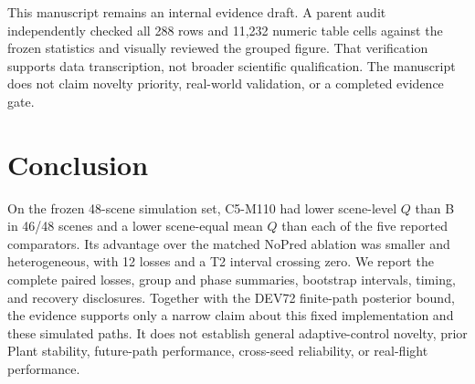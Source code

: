 \documentclass[11pt]{article}
\begin{document}
This manuscript remains an internal evidence draft. A parent audit independently checked all 288 rows and 11,232 numeric table cells against the frozen statistics and visually reviewed the grouped figure. That verification supports data transcription, not broader scientific qualification. The manuscript does not claim novelty priority, real-world validation, or a completed evidence gate.

\section{Conclusion}
On the frozen 48-scene simulation set, C5-M110 had lower scene-level $Q$ than B in 46/48 scenes and a lower scene-equal mean $Q$ than each of the five reported comparators. Its advantage over the matched NoPred ablation was smaller and heterogeneous, with 12 losses and a T2 interval crossing zero. We report the complete paired losses, group and phase summaries, bootstrap intervals, timing, and recovery disclosures. Together with the DEV72 finite-path posterior bound, the evidence supports only a narrow claim about this fixed implementation and these simulated paths. It does not establish general adaptive-control novelty, prior Plant stability, future-path performance, cross-seed reliability, or real-flight performance.



\end{document}
